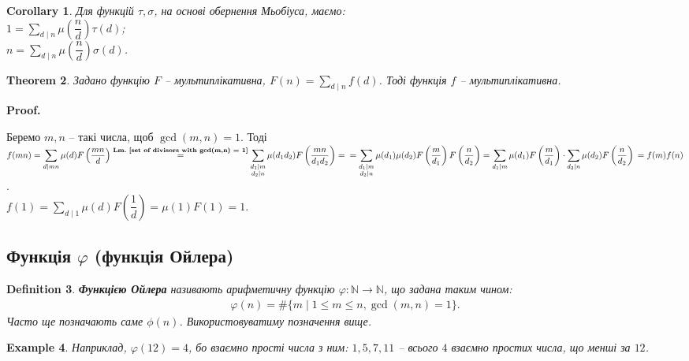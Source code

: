 \documentclass[a4paper, 10pt]{article}
\makeatletter
\theoremstyle{theoremdd}
\newtheorem{theorem}{Theorem}[subsection]
\theoremstyle{theoremdd}
\newtheorem{definition}[theorem]{Definition}
\theoremstyle{theoremdd}
\theoremstyle{theoremdd}
\newtheorem{example}[theorem]{Example}
\theoremstyle{theoremdd}
\theoremstyle{theoremdd}
\theoremstyle{theoremdd}
\theoremstyle{theoremdd}
\newtheorem{corollary}[theorem]{Corollary}
\renewenvironment{proof}[1][Proof.\\]{\par
\pushQED{\hfill \qed}%
\normalfont \topsep6\p@\@plus6\p@\relax
\trivlist
\item\relax
{\bfseries
#1\@addpunct{.}}\hspace\labelsep\ignorespaces
}{%
\popQED\endtrivlist\@endpefalse
}
\newcommand\lmref[1]{\textbf{Lm.~\ref{#1}}}
\makeatother
\begin{document}
\begin{corollary}
Для функцій $\tau,\sigma$, на основі обернення Мьобіуса, маємо:\\
$1 = \displaystyle\sum_{d \mid n} \mu\left( \dfrac{n}{d} \right) \tau(d)$;\\
$n = \displaystyle\sum_{d \mid n} \mu\left( \dfrac{n}{d} \right) \sigma(d)$.
\end{corollary}

\begin{theorem}
Задано функцію $F$ -- мультиплікативна, $F(n) = \displaystyle\sum_{d \mid n} f(d)$. Тоді функція $f$ -- мультиплікативна.
\end{theorem}

\begin{proof}
Беремо $m,n$ -- такі числа, щоб $\gcd(m,n) = 1$. Тоді\\
$f(mn) = \displaystyle\sum_{d \mid mn} \mu(d) F\left( \dfrac{mn}{d} \right) \overset{\text{\lmref{set of divisors with gcd(m,n) = 1}}}{=} \sum_{\substack{d_1 \mid m \\ d_2 \mid n}} \mu(d_1d_2) F\left( \dfrac{mn}{d_1d_2} \right) = \\ = \sum_{\substack{d_1 \mid m \\ d_2 \mid n}} \mu(d_1) \mu(d_2) F\left( \dfrac{m}{d_1} \right) F\left( \dfrac{n}{d_2} \right) = \sum_{d_1 \mid m} \mu(d_1) F\left( \dfrac{m}{d_1} \right) \cdot \sum_{d_2 \mid n} \mu(d_2) F\left( \dfrac{n}{d_2} \right) \\ = f(m)f(n)$.\\
$f(1) = \displaystyle\sum_{d \mid 1} \mu(d) F\left(\dfrac{1}{d}\right) = \mu(1) F(1) = 1$.
\end{proof}

\subsection{Функція $\varphi$ (функція Ойлера)}
\begin{definition}
\textbf{Функцією Ойлера} називають арифметичну функцію $\varphi \colon \mathbb{N} \to \mathbb{N}$, що задана таким чином:
\begin{align*}
\varphi(n) = \#\{m \mid 1 \leq m \leq n, \gcd(m,n) = 1\}.
\end{align*}
Часто ще позначають саме $\phi(n)$. Використовуватиму позначення вище.
\end{definition}

\begin{example}
Наприклад, $\varphi(12) = 4$, бо взаємно прості числа з ним: $1,5,7,11$ -- всього $4$ взаємно простих числа, що менші за $12$.
\end{example}
\end{document}
